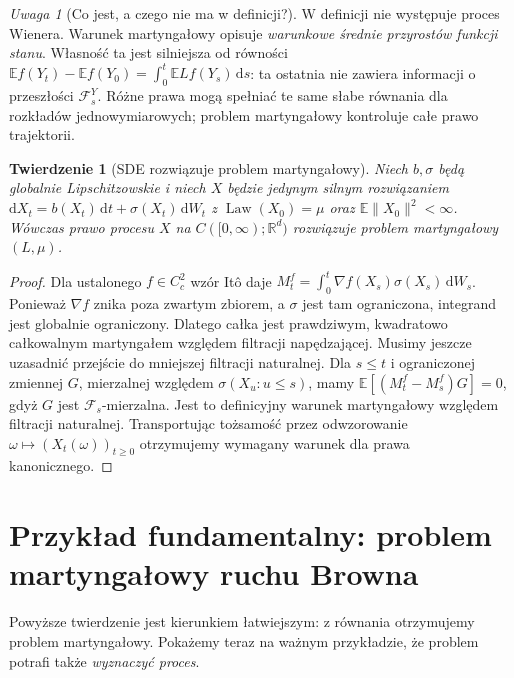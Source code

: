 \documentclass[11pt,a4paper,oneside]{report}
\numberwithin{equation}{chapter}
\theoremstyle{plain}
\newtheorem{twierdzenie}{Twierdzenie}[chapter]
\theoremstyle{definition}
\theoremstyle{remark}
\newtheorem{uwaga}{Uwaga}[chapter]
\newcommand{\R}{\mathbb{R}}
\newcommand{\E}{\mathbb{E}}
\newcommand{\Law}{\operatorname{Law}}
\newcommand{\calF}{\mathcal{F}}
\newcommand{\dd}{\mathrm{d}}
\newcommand{\norm}[1]{\lVert #1\rVert}
\begin{document}
\begin{uwaga}[Co jest, a czego nie ma w definicji?]
W definicji nie występuje proces Wienera. Warunek
martyngałowy opisuje \emph{warunkowe średnie przyrostów funkcji
stanu}. Własność ta jest silniejsza od równości
$\E f(Y_t)-\E f(Y_0)=\int_0^t\E Lf(Y_s)\,\dd s$:
ta ostatnia nie zawiera informacji o przeszłości $\calF_s^Y$.
Różne prawa mogą spełniać te same słabe równania dla rozkładów
jednowymiarowych; problem martyngałowy kontroluje całe prawo trajektorii.
\end{uwaga}

\begin{twierdzenie}[SDE rozwiązuje problem martyngałowy]\label{thm:volIII:07:01}
\label{th:sde-to-mp}
Niech $b,\sigma$ będą globalnie Lipschitzowskie i niech $X$ będzie
jedynym silnym rozwiązaniem
$\dd X_t=b(X_t)\,\dd t+\sigma(X_t)\,\dd W_t$
z $\Law(X_0)=\mu$ oraz $\E\norm{X_0}^2<\infty$.
Wówczas prawo procesu $X$ na $C([0,\infty);\R^d)$ rozwiązuje
problem martyngałowy $(L,\mu)$.
\end{twierdzenie}
\begin{proof}
Dla ustalonego $f\in C_c^2$ wzór Itô daje
$M_t^f=\int_0^t\nabla f(X_s)\sigma(X_s)\,\dd W_s$.
Ponieważ $\nabla f$ znika poza zwartym zbiorem, a $\sigma$ jest
tam ograniczona, integrand jest globalnie ograniczony.
Dlatego całka jest prawdziwym, kwadratowo całkowalnym
martyngałem względem filtracji napędzającej. Musimy jeszcze
uzasadnić przejście do mniejszej filtracji naturalnej.
Dla $s\le t$ i ograniczonej zmiennej $G$, mierzalnej względem
$\sigma(X_u:u\le s)$, mamy $\E[(M_t^f-M_s^f)G]=0$,
gdyż $G$ jest $\calF_s$-mierzalna. Jest to definicyjny
warunek martyngałowy względem filtracji naturalnej.
Transportując tożsamość przez odwzorowanie
$\omega\mapsto(X_t(\omega))_{t\ge0}$ otrzymujemy
wymagany warunek dla prawa kanonicznego.
\end{proof}

\section{Przykład fundamentalny: problem martyngałowy ruchu Browna}\label{sec:volIII:07:02}

Powyższe twierdzenie jest kierunkiem łatwiejszym: z równania
otrzymujemy problem martyngałowy. Pokażemy teraz na ważnym
przykładzie, że problem potrafi także \emph{wyznaczyć proces}.
\end{document}
